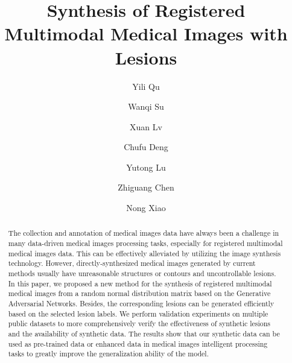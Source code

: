 \documentclass[runningheads]{llncs}
\begin{document}
	\title{Synthesis of Registered Multimodal
		Medical Images with Lesions}
	\author{ Yili Qu \and Wanqi Su \and Xuan Lv \and Chufu Deng 
		\and Yutong Lu \and Zhiguang Chen \and Nong Xiao}
	\maketitle       %
	\begin{abstract}
	The collection and annotation of medical images data have always been a challenge in many data-driven medical images processing tasks, especially for registered multimodal medical images data. This can be effectively alleviated by utilizing the image synthesis technology. However, directly-synthesized medical images generated by current methods usually have unreasonable structures or contours and uncontrollable lesions. In this paper, we proposed a new method for the synthesis of registered multimodal medical images from a random normal distribution matrix based on the Generative Adversarial Networks. Besides, the corresponding lesions can be generated efficiently based on the selected lesion labels. We perform validation experiments on multiple public datasets to more comprehensively verify the effectiveness of synthetic lesions and the availability of synthetic data. The results show that our synthetic data can be used as pre-trained data or enhanced data in medical images intelligent processing tasks to greatly improve the generalization ability of the model. 
		
	\end{abstract}
\end{document}

